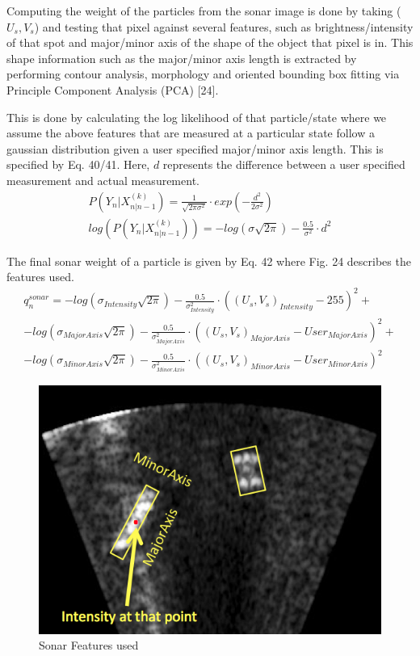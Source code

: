 \documentclass[a4paper]{IEEEtran}
\begin{document}
Computing the weight of the particles from the sonar image is done by taking ($U_{s}, V_{s}$) and testing that pixel against several features, such as brightness/intensity of that spot and major/minor axis of the shape of the object that pixel is in. This shape information such as the major/minor axis length is extracted by performing contour analysis, morphology and oriented bounding box fitting via Principle Component Analysis (PCA) [24].

This is done by calculating the log likelihood of that particle/state where we assume the above features that are measured at a particular state follow a gaussian distribution given a user specified major/minor axis length. This is specified by Eq. 40/41. Here, $d$ represents the difference between a user specified measurement and actual measurement.
\begingroup\makeatletter\def\f@size{7}\check@mathfonts
\begin{gather}
P(Y_{n}|X_{n|n-1}^{(k)})=\frac{1}{\sqrt{2\pi\sigma^{2}}}\cdot exp(-\frac{d^{2}}{2\sigma^{2}}) \\
log(P(Y_{n}|X_{n|n-1}^{(k)}))=-log(\sigma\sqrt{2\pi})-\frac{0.5}{\sigma^{2}}\cdot d^{2}
\end{gather}
\endgroup 

The final sonar weight of a particle is given by Eq. 42 where Fig. 24 describes the features used.
\begingroup\makeatletter\def\f@size{7}\check@mathfonts
\begin{gather}
q_{n}^{sonar}=-log(\sigma_{Intensity}\sqrt{2\pi})-\frac{0.5}{\sigma_{Intensity}^{2}}\cdot((U_{s},V_{s})_{Intensity}-255)^{2}+ \nonumber\\
-log(\sigma_{MajorAxis}\sqrt{2\pi})-\frac{0.5}{\sigma_{MajorAxis}^{2}}\cdot((U_{s},V_{s})_{MajorAxis}-User_{MajorAxis})^{2}+ \nonumber\\
-log(\sigma_{MinorAxis}\sqrt{2\pi})-\frac{0.5}{\sigma_{MinorAxis}^{2}}\cdot((U_{s},V_{s})_{MinorAxis}-User_{MinorAxis})^{2}
\end{gather}
\endgroup 

\begin{figure}[h!]
  \centering
  \includegraphics[scale=0.3]{majorminor}
  \captionsetup{justification=centering}
  \caption{Sonar Features used}
\end{figure}
\end{document}
